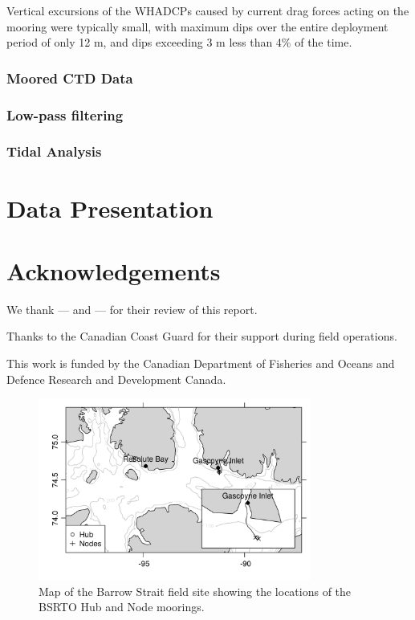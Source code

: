 \documentclass[12pt]{dforeport}
\begin{document}
Vertical excursions of the WHADCPs caused by current drag forces acting on the mooring were typically small, with maximum dips over the entire deployment period of only 12 m, and dips exceeding 3 m less than 4\% of the time.  

\subsubsection{Moored CTD Data}

\subsubsection{Low-pass filtering}

\subsubsection{Tidal Analysis}

\section{Data Presentation}

\section{Acknowledgements}

We thank --- and --- for their review of this report.

\noindent
Thanks to the Canadian Coast Guard for their support during field operations.

\noindent
This work is funded by the Canadian Department of Fisheries and Oceans and Defence Research and Development Canada. 

\pagebreak




\pagebreak

\begin{figure}
\centering
\includegraphics[width = 0.8\textwidth]{./figures/01_BSFieldSiteOverview.png}
\caption[Map of field site]{Map of the Barrow Strait field site showing the locations of the BSRTO Hub and Node moorings.}
\label{f:map}
\end{figure}
\end{document}
